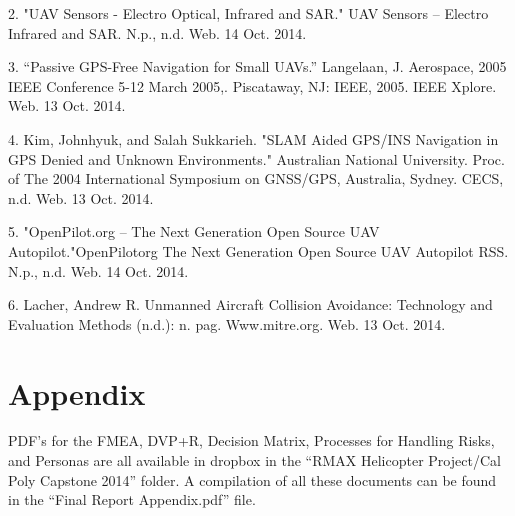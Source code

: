 \documentclass[12pt]{article}
\begin{document}
2. "UAV Sensors - Electro Optical, Infrared and SAR." UAV Sensors – Electro Infrared and SAR. N.p., n.d. Web. 14 Oct. 2014.

3. “Passive GPS-Free Navigation for Small UAVs.” Langelaan, J. Aerospace, 2005 IEEE Conference 5-12 March 2005,. Piscataway, NJ: IEEE, 2005. IEEE Xplore. Web. 13 Oct. 2014.

4. Kim, Johnhyuk, and Salah Sukkarieh. "SLAM Aided GPS/INS Navigation in GPS Denied and Unknown Environments." Australian National University. Proc. of The 2004 International Symposium on GNSS/GPS, Australia, Sydney. CECS, n.d. Web. 13 Oct. 2014.

5. "OpenPilot.org – The Next Generation Open Source UAV Autopilot."OpenPilotorg The Next Generation Open Source UAV Autopilot RSS. N.p., n.d. Web. 14 Oct. 2014.

6. Lacher, Andrew R. Unmanned Aircraft Collision Avoidance: Technology and Evaluation Methods (n.d.): n. pag. Www.mitre.org. Web. 13 Oct. 2014.

\section{Appendix}
PDF’s for the FMEA, DVP+R, Decision Matrix, Processes for Handling Risks, and Personas are all available in dropbox in the “RMAX Helicopter Project/Cal Poly Capstone 2014” folder. A compilation of all these documents can be found in the “Final Report Appendix.pdf” file. 
\end{document}
